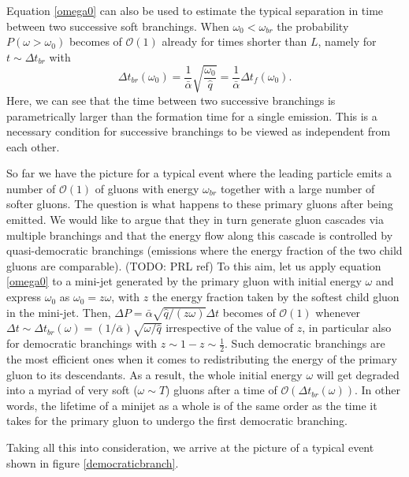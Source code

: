 \documentclass[a4paper,12pt]{article}
\numberwithin{equation}{section}
\begin{document}
Equation \eqref{omega0} can also be used to estimate the typical separation in time between two successive soft branchings. When $\omega_0 < \omega_{br}$ the probability $P(\omega>\omega_0)$ becomes of $\mathcal{O}(1)$ already for times shorter than $L$, namely for $t\sim \Delta t_{br}$ with
\begin{equation}
\Delta t_{br}(\omega_0)=\frac{1}{\bar{\alpha}} \sqrt{\frac{\omega_0}{\hat{q}}} = \frac{1}{\bar{\alpha}} \Delta t_f(\omega_0).
\end{equation}
Here, we can see that the time between two successive branchings is parametrically larger than the formation time for a single emission. This is a necessary condition for successive branchings to be viewed as independent from each other. 

So far we have the picture for a typical event where the leading particle emits a number of $\mathcal{O}(1)$ of gluons with energy $\omega_{br}$ together with a large number of softer gluons. The question is what happens to these primary gluons after being emitted. We would like to argue that they in turn generate gluon cascades via multiple branchings and that the energy flow along this cascade is controlled by quasi-democratic branchings (emissions where the energy fraction of the two child gluons are comparable). (TODO: PRL ref) To this aim, let us apply equation \eqref{omega0} to a mini-jet generated by the primary gluon with initial energy $\omega$ and express $\omega_0$ as $\omega_0=z\omega$, with $z$ the energy fraction taken by the softest child gluon in the mini-jet. Then, $\Delta P = \bar{\alpha} \sqrt{{\hat{q}}/{(z \omega)}}\Delta t$ becomes of $\mathcal{O}(1)$ whenever $\Delta t \sim \Delta t_{br}(\omega)=({1}/{\bar{\alpha}}) \sqrt{{\omega}/{\hat{q}}}$ irrespective of the value of $z$, in particular also for democratic branchings with $z \sim 1-z \sim \frac{1}{2}$. Such democratic branchings are the most efficient ones when it comes to redistributing the energy of the primary gluon to its descendants. As a result, the whole initial energy $\omega$ will get degraded into a myriad of very soft ($\omega \sim T$) gluons after a time of $\mathcal{O}(\Delta t_{br}(\omega))$. In other words, the lifetime of a minijet as a whole is of the same order as the time it takes for the primary gluon to undergo the first democratic branching.

Taking all this into consideration, we arrive at the picture of a typical event shown in figure \ref{democraticbranch}.
\end{document}
